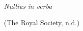 
\begin{epigrafe}
  \vspace*{\fill}
	\begin{flushright}
\emph{Nullius in verba}

(The Royal Society, n.d.)
	\end{flushright}
\end{epigrafe}


